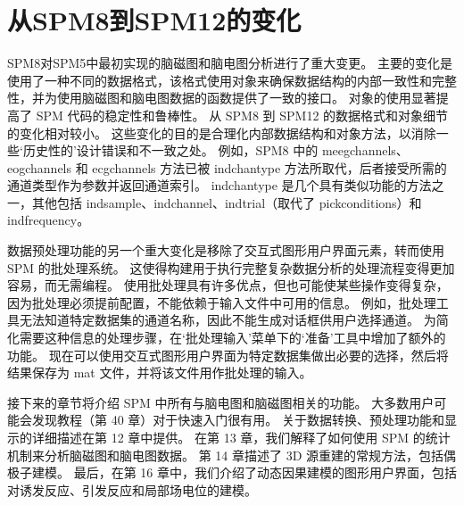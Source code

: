 \section{从SPM8到SPM12的变化}

SPM8对SPM5中最初实现的脑磁图和脑电图分析进行了重大变更。
主要的变化是使用了一种不同的数据格式，该格式使用对象来确保数据结构的内部一致性和完整性，并为使用脑磁图和脑电图数据的函数提供了一致的接口。
对象的使用显著提高了 SPM 代码的稳定性和鲁棒性。
从 SPM8 到 SPM12 的数据格式和对象细节的变化相对较小。
这些变化的目的是合理化内部数据结构和对象方法，以消除一些‘历史性的’设计错误和不一致之处。
例如，SPM8 中的 meegchannels、eogchannels 和 ecgchannels 方法已被 indchantype 方法所取代，后者接受所需的通道类型作为参数并返回通道索引。
indchantype 是几个具有类似功能的方法之一，其他包括 indsample、indchannel、indtrial（取代了 pickconditions）和 indfrequency。

数据预处理功能的另一个重大变化是移除了交互式图形用户界面元素，转而使用 SPM 的批处理系统。
这使得构建用于执行完整复杂数据分析的处理流程变得更加容易，而无需编程。
使用批处理具有许多优点，但也可能使某些操作变得复杂，因为批处理必须提前配置，不能依赖于输入文件中可用的信息。
例如，批处理工具无法知道特定数据集的通道名称，因此不能生成对话框供用户选择通道。
为简化需要这种信息的处理步骤，在‘批处理输入’菜单下的‘准备’工具中增加了额外的功能。
现在可以使用交互式图形用户界面为特定数据集做出必要的选择，然后将结果保存为 mat 文件，并将该文件用作批处理的输入。

接下来的章节将介绍 SPM 中所有与脑电图和脑磁图相关的功能。
大多数用户可能会发现教程（第 40 章）对于快速入门很有用。
关于数据转换、预处理功能和显示的详细描述在第 12 章中提供。
在第 13 章，我们解释了如何使用 SPM 的统计机制来分析脑磁图和脑电图数据。
第 14 章描述了 3D 源重建的常规方法，包括偶极子建模。
最后，在第 16 章中，我们介绍了动态因果建模的图形用户界面，包括对诱发反应、引发反应和局部场电位的建模。
